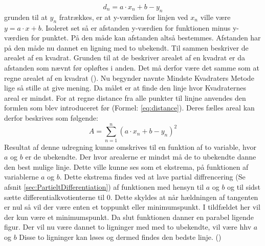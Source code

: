 \begin{equation}\label{eq:distance}
    d_n = a \cdot x_n + b - y_n
\end{equation} grunden til at $y_n$ fratrækkes, er at y-værdien for linjen ved $x_n$ ville være $y = a \cdot x + b$. Isoleret set så er afstanden y-værdien for funktionen minus y-værdien for punktet. På den måde kan afstanden altså bestemmes. Afstanden har på den måde nu dannet en ligning med to ubekendt. Til sammen beskriver de arealet af en kvadrat. Grunden til at de beskriver arealet af en kvadrat er da afstanden som nævnt før opløftes i anden. Det må derfor være det samme som at regne arealet af en kvadrat (\cite{Bentzen2014}). Nu begynder navnte Mindste Kvadraters Metode lige så stille at give mening. Da målet er at finde den linje hvor Kvadraternes areal er mindst. For at regne distance fra alle punkter til linjne anvendes den formlen som blev introduceret før (Formel: \ref{eq:distance}). Deres fælles areal kan derfor beskrives som følgende:
\begin{equation}\label{eq:formularForDistanceForAllDataPoints}A = \sum_{n=1}^n (a \cdot x_n + b - y_n)^2\end{equation}
Resultat af denne udregning kunne omskrives til en funktion af to variable, hvor $a$ og $b$ er de ubekendte. Der hvor arealerne er mindst må de to ubekendte danne den best mulige linje. Dette ville kunne ses som et ekstrema, på funktionen af variablerne $a$ og $b$. Dette ekstrema findes ved at lave partial diffrencering (Se afsnit \ref{sec:PartieltDifferentiation}) af funktionen med hensyn til $a$ og $b$ og til sidst sætte differentialkvotienterne til 0. Dette skyldes at når hældningen af tangenten er nul så vil der være enten et toppunkt eller minimumspunkt. I tildfældet her vil der kun være et minimumspunkt. Da slut funktionen danner en parabel ligende figur. Der vil nu være dannet to ligninger med med to ubekendte, vil være hhv $a$ og $b$ Disse to ligninger kan løses og dermed findes den bedste linje. (\cite{webmatematikMindsteKvadratersMetode})


